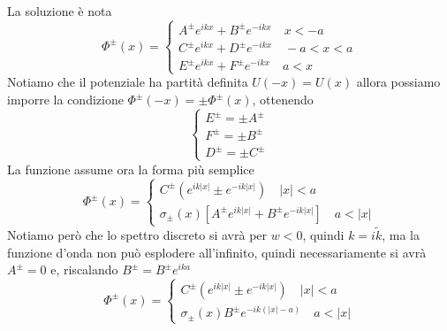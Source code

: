 \documentclass[a4paper]{article}
\begin{document}
        La soluzione è nota
        \begin{equation*}
            \Phi^\pm(x)=
            \begin{cases}
                A^\pm e^{ikx}+B^\pm e^{-ikx}\quad x<-a\\
                C^\pm e^{ikx}+D^\pm e^{-ikx}\quad -a<x<a\\
                E^\pm e^{ikx}+F^\pm e^{-ikx}\quad a<x
            \end{cases}
        \end{equation*}
        Notiamo che il potenziale ha partità definita $U(-x)=U(x)$ allora possiamo imporre la condizione $\Phi^\pm(-x)=\pm\Phi^\pm(x)$, ottenendo
        \begin{equation*}
            \begin{cases}
                E^\pm=\pm A^\pm\\
                F^\pm=\pm B^\pm\\
                D^\pm=\pm C^\pm
            \end{cases}
        \end{equation*}
        La funzione assume ora la forma più semplice
        \begin{equation*}
            \Phi^\pm(x)=
            \begin{cases}
                C^\pm \left(e^{ik\left\lvert x\right\rvert }\pm e^{-ik\left\lvert x\right\rvert }\right)\quad \left\lvert x\right\rvert<a\\
                \sigma_\pm(x)\left[A^\pm e^{ik\left\lvert x\right\rvert }+B^\pm e^{-ik\left\lvert x\right\rvert }\right]\quad a<\left\lvert x\right\rvert
            \end{cases}
        \end{equation*}
        Notiamo però che lo spettro discreto si avrà per $w<0$, quindi $k=i\tilde{k}$, ma la funzione d'onda non può esplodere all'infinito, quindi necessariamente si avrà $A^\pm=0$ e, riscalando $B^\pm=B^\pm e^{ika}$
        \begin{equation*}
            \Phi^\pm(x)=
            \begin{cases}
                C^\pm \left(e^{ik\left\lvert x\right\rvert }\pm e^{-ik\left\lvert x\right\rvert }\right)\quad \left\lvert x\right\rvert<a\\
                \sigma_\pm(x)B^\pm e^{-ik(\left\lvert x\right\rvert-a)}\quad a<\left\lvert x\right\rvert
            \end{cases}
        \end{equation*}
\end{document}

